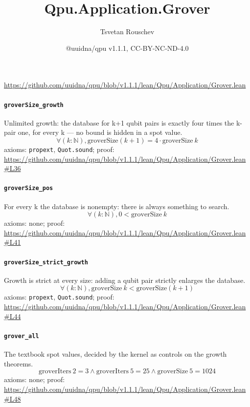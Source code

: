 \documentclass[11pt]{article}
\title{Qpu.Application.Grover}
\author{Tsvetan Rouschev}
\date{@uuidna/qpu v1.1.1, CC-BY-NC-ND-4.0}
\begin{document}
\maketitle
\noindent\url{https://github.com/uuidna/qpu/blob/v1.1.1/lean/Qpu/Application/Grover.lean}

\paragraph{\texttt{groverSize\_growth}}
Unlimited growth: the database for k+1 qubit pairs is exactly four times the k-pair one, for every k — no bound is hidden in a spot value.
\[ \forall (k : \mathbb{N}), \mathrm{groverSize} (k + 1) = 4 \cdot \mathrm{groverSize}\ k \]
\noindent axioms: \texttt{propext}, \texttt{Quot.sound}; proof: \url{https://github.com/uuidna/qpu/blob/v1.1.1/lean/Qpu/Application/Grover.lean\#L36}

\paragraph{\texttt{groverSize\_pos}}
For every k the database is nonempty: there is always something to search.
\[ \forall (k : \mathbb{N}), 0 < \mathrm{groverSize}\ k \]
\noindent axioms: none; proof: \url{https://github.com/uuidna/qpu/blob/v1.1.1/lean/Qpu/Application/Grover.lean\#L41}

\paragraph{\texttt{groverSize\_strict\_growth}}
Growth is strict at every size: adding a qubit pair strictly enlarges the database.
\[ \forall (k : \mathbb{N}), \mathrm{groverSize}\ k < \mathrm{groverSize} (k + 1) \]
\noindent axioms: \texttt{propext}, \texttt{Quot.sound}; proof: \url{https://github.com/uuidna/qpu/blob/v1.1.1/lean/Qpu/Application/Grover.lean\#L44}

\paragraph{\texttt{grover\_all}}
The textbook spot values, decided by the kernel as controls on the growth theorems.
\[ \mathrm{groverIters}\ 2 = 3 \land \mathrm{groverIters}\ 5 = 25 \land \mathrm{groverSize}\ 5 = 1024 \]
\noindent axioms: none; proof: \url{https://github.com/uuidna/qpu/blob/v1.1.1/lean/Qpu/Application/Grover.lean\#L48}
\end{document}
